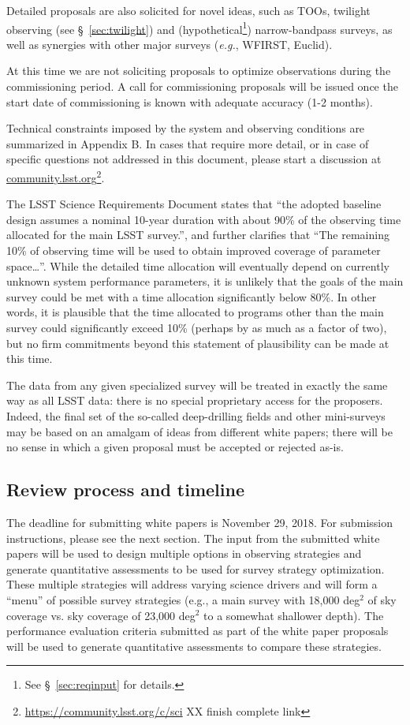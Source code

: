 \documentclass[DM,lsstdraft,toc,usenatbib]{lsstdoc}
\begin{document}
Detailed proposals are also solicited for novel ideas, such as TOOs, twilight observing (see \S~\ref{sec:twilight}) and 
(hypothetical\footnote{See \S~\ref{sec:reqinput} for details.}) narrow-bandpass surveys, as well as synergies 
with other major surveys ({\it e.g.}, WFIRST, Euclid). 

At this time we are not soliciting proposals to optimize observations during the commissioning period.
A call for commissioning proposals will be issued once the start date of commissioning is known with adequate accuracy (1-2 months). 

Technical constraints imposed by the system and observing conditions are summarized in 
Appendix B. In cases that require more detail, or in case of specific questions not addressed in this 
document, please start a discussion at \href{http://community.lsst.org}{community.lsst.org}\footnote{\url{https://community.lsst.org/c/sci} XX finish complete link}.

The LSST Science Requirements Document states that ``the adopted baseline design assumes a 
nominal 10-year duration with about 90\% of the observing time allocated for the main LSST survey.'',
and further clarifies that ``The remaining 10\% of observing time will be used to obtain improved 
coverage of parameter space\dots''. While the detailed time allocation will eventually depend on currently unknown system
performance parameters, it is unlikely that the goals of the main survey could be met with a time allocation
significantly below 80\%. In other words, it is plausible that the time allocated to programs other
than the main survey could significantly exceed 10\% (perhaps by as much as a factor of two), but 
no firm commitments beyond this statement of plausibility can be made at this time. 

The data from any given specialized survey will be treated in exactly the same way as all LSST 
data: there is no special proprietary access for the proposers. Indeed, the final set of the so-called
deep-drilling fields and other mini-surveys may be based on an amalgam of ideas from different 
white papers; there will be no sense in which a given proposal must be accepted or rejected as-is.  


\subsection{Review process and timeline}

The deadline for submitting white papers is November 29, 2018. For submission instructions, 
please see the next section. The input from the submitted white papers will be used to design multiple
options in observing strategies and generate quantitative assessments to be used for survey strategy optimization.
These multiple strategies will address varying science drivers and will form a ``menu'' of possible survey strategies (e.g., a main 
survey with 18,000 deg$^2$ of sky coverage vs. sky coverage of 23,000 deg$^2$ to a
somewhat shallower depth). The performance evaluation criteria submitted as part of the white paper proposals
will be used to generate quantitative assessments to compare these strategies. 
\end{document}
